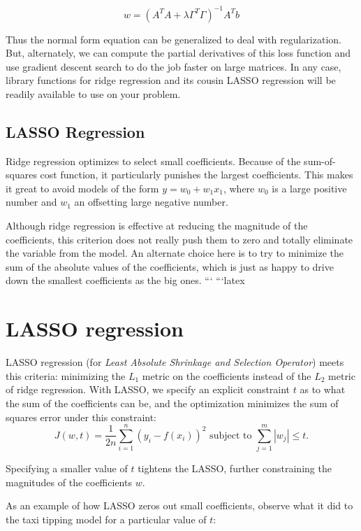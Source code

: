 \documentclass[10pt]{article}
\begin{document}
\[
w = (A^{T} A + \lambda \Gamma^{T} \Gamma)^{-1} A^{T} b
\]

Thus the normal form equation can be generalized to deal with regularization. But, alternately, we can compute the partial derivatives of this loss function and use gradient descent search to do the job faster on large matrices. In any case, library functions for ridge regression and its cousin LASSO regression will be readily available to use on your problem.

\subsection{LASSO Regression}
Ridge regression optimizes to select small coefficients. Because of the sum-of-squares cost function, it particularly punishes the largest coefficients. This makes it great to avoid models of the form $y=w_{0}+w_{1}x_{1}$, where $w_{0}$ is a large positive number and $w_{1}$ an offsetting large negative number.

Although ridge regression is effective at reducing the magnitude of the coefficients, this criterion does not really push them to zero and totally eliminate the variable from the model. An alternate choice here is to try to minimize the sum of the absolute values of the coefficients, which is just as happy to drive down the smallest coefficients as the big ones.
```
```latex
\section{LASSO regression}
LASSO regression (for \emph{Least Absolute Shrinkage and Selection Operator}) meets this criteria: minimizing the \(L_{1}\) metric on the coefficients instead of the \(L_{2}\) metric of ridge regression. With LASSO, we specify an explicit constraint \(t\) as to what the sum of the coefficients can be, and the optimization minimizes the sum of squares error under this constraint:
\[
J(w, t)=\frac{1}{2n}\sum_{i=1}^{n}\left(y_{i}-f(x_{i})\right)^{2} \text{ subject to } \sum_{j=1}^{m}\left|w_{j}\right| \leq t.
\]

Specifying a smaller value of \(t\) tightens the LASSO, further constraining the magnitudes of the coefficients \(w\).

As an example of how LASSO zeros out small coefficients, observe what it did to the taxi tipping model for a particular value of \(t\):
\end{document}

